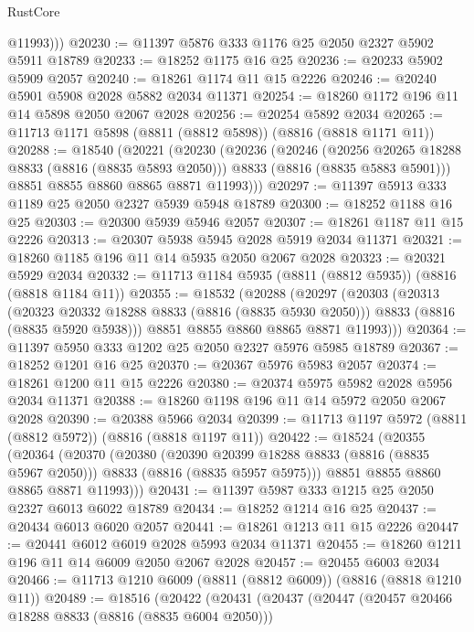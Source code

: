 \begin{lexlean}{RustCore}
\begin{coremodule}
          @11993)))
@20230 := @11397 @5876 @333 @1176 @25 @2050 @2327 @5902 @5911 @18789
@20233 := @18252 @1175 @16 @25
@20236 := @20233 @5902 @5909 @2057
@20240 := @18261 @1174 @11 @15 @2226
@20246 := @20240 @5901 @5908 @2028 @5882 @2034 @11371
@20254 := @18260 @1172 @196 @11 @14 @5898 @2050 @2067 @2028
@20256 := @20254 @5892 @2034
@20265 := @11713 @1171 @5898 (@8811 (@8812 @5898)) (@8816 (@8818 @1171 @11))
@20288 := @18540
    (@20221
      (@20230
        (@20236
          (@20246
            (@20256 @20265 @18288 @8833 (@8816 (@8835 @5893 @2050)))
            @8833
            (@8816 (@8835 @5883 @5901)))
          @8851
          @8855
          @8860
          @8865
          @8871
          @11993)))
@20297 := @11397 @5913 @333 @1189 @25 @2050 @2327 @5939 @5948 @18789
@20300 := @18252 @1188 @16 @25
@20303 := @20300 @5939 @5946 @2057
@20307 := @18261 @1187 @11 @15 @2226
@20313 := @20307 @5938 @5945 @2028 @5919 @2034 @11371
@20321 := @18260 @1185 @196 @11 @14 @5935 @2050 @2067 @2028
@20323 := @20321 @5929 @2034
@20332 := @11713 @1184 @5935 (@8811 (@8812 @5935)) (@8816 (@8818 @1184 @11))
@20355 := @18532
    (@20288
      (@20297
        (@20303
          (@20313
            (@20323 @20332 @18288 @8833 (@8816 (@8835 @5930 @2050)))
            @8833
            (@8816 (@8835 @5920 @5938)))
          @8851
          @8855
          @8860
          @8865
          @8871
          @11993)))
@20364 := @11397 @5950 @333 @1202 @25 @2050 @2327 @5976 @5985 @18789
@20367 := @18252 @1201 @16 @25
@20370 := @20367 @5976 @5983 @2057
@20374 := @18261 @1200 @11 @15 @2226
@20380 := @20374 @5975 @5982 @2028 @5956 @2034 @11371
@20388 := @18260 @1198 @196 @11 @14 @5972 @2050 @2067 @2028
@20390 := @20388 @5966 @2034
@20399 := @11713 @1197 @5972 (@8811 (@8812 @5972)) (@8816 (@8818 @1197 @11))
@20422 := @18524
    (@20355
      (@20364
        (@20370
          (@20380
            (@20390 @20399 @18288 @8833 (@8816 (@8835 @5967 @2050)))
            @8833
            (@8816 (@8835 @5957 @5975)))
          @8851
          @8855
          @8860
          @8865
          @8871
          @11993)))
@20431 := @11397 @5987 @333 @1215 @25 @2050 @2327 @6013 @6022 @18789
@20434 := @18252 @1214 @16 @25
@20437 := @20434 @6013 @6020 @2057
@20441 := @18261 @1213 @11 @15 @2226
@20447 := @20441 @6012 @6019 @2028 @5993 @2034 @11371
@20455 := @18260 @1211 @196 @11 @14 @6009 @2050 @2067 @2028
@20457 := @20455 @6003 @2034
@20466 := @11713 @1210 @6009 (@8811 (@8812 @6009)) (@8816 (@8818 @1210 @11))
@20489 := @18516
    (@20422
      (@20431
        (@20437
          (@20447
            (@20457 @20466 @18288 @8833 (@8816 (@8835 @6004 @2050)))

\end{coremodule}
\end{lexlean}

